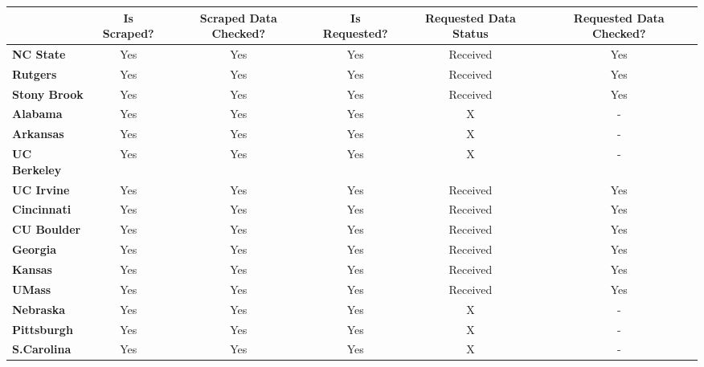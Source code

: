 \begin{tabular*}{\textwidth}{@{\extracolsep{\fill} } lccccc}%
\textbf{}&\textbf{Is Scraped?}&\textbf{Scraped Data Checked?}&\textbf{Is Requested?}&\textbf{Requested Data Status}&\textbf{Requested Data Checked?}\\%
\hline%
\bfseries NC State&Yes&Yes&Yes&Received&Yes\\%
\bfseries Rutgers&Yes&Yes&Yes&Received&Yes\\%
\bfseries Stony Brook&Yes&Yes&Yes&Received&Yes\\%
\bfseries Alabama&Yes&Yes&Yes&X&{-}\\%
\bfseries Arkansas&Yes&Yes&Yes&X&{-}\\%
\bfseries UC Berkeley&Yes&Yes&Yes&X&{-}\\%
\bfseries UC Irvine&Yes&Yes&Yes&Received&Yes\\%
\bfseries Cincinnati&Yes&Yes&Yes&Received&Yes\\%
\bfseries CU Boulder&Yes&Yes&Yes&Received&Yes\\%
\bfseries Georgia&Yes&Yes&Yes&Received&Yes\\%
\bfseries Kansas&Yes&Yes&Yes&Received&Yes\\%
\bfseries UMass&Yes&Yes&Yes&Received&Yes\\%
\bfseries Nebraska&Yes&Yes&Yes&X&{-}\\%
\bfseries Pittsburgh&Yes&Yes&Yes&X&{-}\\%
\bfseries S.Carolina&Yes&Yes&Yes&X&{-}\\%
\hline%
\end{tabular*}